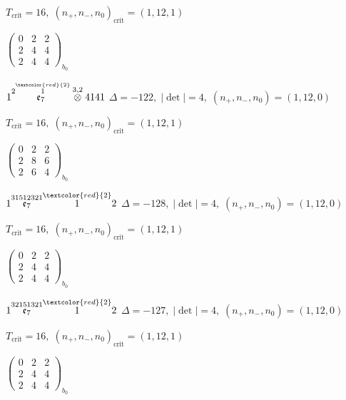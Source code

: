 \documentclass[10pt]{article}
\begin{document}
\hspace{1em}$T_{\text{crit}}=16,\; (n_+,n_-,n_0)_{\text{crit}}=(1,12,1)$

\hspace{2em}$\left(\begin{smallmatrix}0 & 2 & 2 \\ 2 & 4 & 4 \\ 2 & 4 & 4\end{smallmatrix}\right)_{\!b_0}$

\smallskip

$1\overset{2\overset{\textcolor{red}{2}}{1}}{\mathfrak{e}_7}\overset{3,2}{\otimes}4141$ \quad $\Delta=-122,\; |\det|=4,\; (n_+,n_-,n_0)=(1,12,0)$

\hspace{1em}$T_{\text{crit}}=16,\; (n_+,n_-,n_0)_{\text{crit}}=(1,12,1)$

\hspace{2em}$\left(\begin{smallmatrix}0 & 2 & 2 \\ 2 & 8 & 6 \\ 2 & 6 & 4\end{smallmatrix}\right)_{\!b_0}$

\smallskip

$1\overset{31512321}{\mathfrak{e}_7}\overset{\textcolor{red}{2}}{1}2$ \quad $\Delta=-128,\; |\det|=4,\; (n_+,n_-,n_0)=(1,12,0)$

\hspace{1em}$T_{\text{crit}}=16,\; (n_+,n_-,n_0)_{\text{crit}}=(1,12,1)$

\hspace{2em}$\left(\begin{smallmatrix}0 & 2 & 2 \\ 2 & 4 & 4 \\ 2 & 4 & 4\end{smallmatrix}\right)_{\!b_0}$

\smallskip

$1\overset{32151321}{\mathfrak{e}_7}\overset{\textcolor{red}{2}}{1}2$ \quad $\Delta=-127,\; |\det|=4,\; (n_+,n_-,n_0)=(1,12,0)$

\hspace{1em}$T_{\text{crit}}=16,\; (n_+,n_-,n_0)_{\text{crit}}=(1,12,1)$

\hspace{2em}$\left(\begin{smallmatrix}0 & 2 & 2 \\ 2 & 4 & 4 \\ 2 & 4 & 4\end{smallmatrix}\right)_{\!b_0}$
\end{document}
